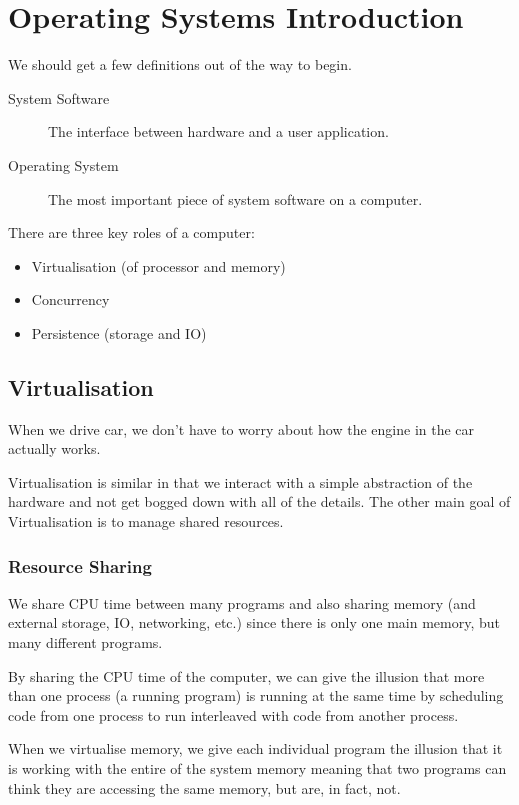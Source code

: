 \section{Operating Systems Introduction}\label{sec:operating_systems_introduction}
\begin{note}
	We should get a few definitions out of the way to begin.
	\begin{description}
		\item[System Software] The interface between hardware and a user application.
		\item[Operating System] The most important piece of system software on a computer.
	\end{description}
\end{note}
\noindent
There are three key roles of a computer:
\begin{itemize}
	\item Virtualisation (of processor and memory)
	\item Concurrency
	\item Persistence (storage and IO)
\end{itemize}

\subsection{Virtualisation}\label{sub:virtualisation}

When we drive car, we don't have to worry about how the engine in the car actually works.

Virtualisation is similar in that we interact with a simple abstraction of the hardware and not get bogged down with all of the details.
The other main goal of Virtualisation is to manage shared resources.

\subsubsection{Resource Sharing}\label{ssub:resource_sharing}

We share CPU time between many programs and also sharing memory (and external storage, IO, networking, etc.) since there is only one main memory, but many different programs.

By sharing the CPU time of the computer, we can give the illusion that more than one process (a running program) is running at the same time by scheduling code from one process to run interleaved with code from another process.

When we virtualise memory, we give each individual program the illusion that it is working with the entire of the system memory meaning that two programs can think they are accessing the same memory, but are, in fact, not.

